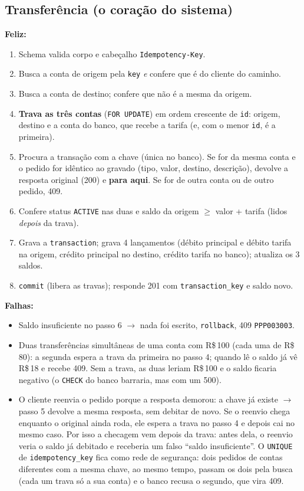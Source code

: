 \documentclass[11pt,a4paper]{article}
\newcommand{\rs}{R\$\,}
\newcommand{\tb}[1]{\texttt{#1}}           %
\begin{document}
\subsection{Transferência (o coração do sistema)}
\textbf{Feliz:}
\begin{enumerate}
  \item Schema valida corpo e cabeçalho \tb{Idempotency-Key}.
  \item Busca a conta de origem pela \tb{key} \emph{e} confere que é do cliente do caminho.
  \item Busca a conta de destino; confere que não é a mesma da origem.
  \item \textbf{Trava as três contas} (\tb{FOR UPDATE}) em ordem crescente de \tb{id}: origem,
        destino e a conta do banco, que recebe a tarifa (e, com o menor \tb{id}, é a primeira).
  \item Procura a transação com a chave (única no banco). Se for da mesma conta e o pedido for
        idêntico ao gravado (tipo, valor, destino, descrição), devolve a resposta original (200)
        e \textbf{para aqui}. Se for de outra conta ou de outro pedido, 409.
  \item Confere status \tb{ACTIVE} nas duas e saldo da origem $\ge$ valor + tarifa (lidos
        \emph{depois} da trava).
  \item Grava a \tb{transaction}; grava 4 lançamentos (débito principal e débito tarifa na
        origem, crédito principal no destino, crédito tarifa no banco); atualiza os 3 saldos.
  \item \tb{commit} (libera as travas); responde 201 com \tb{transaction_key} e saldo novo.
\end{enumerate}
\textbf{Falhas:}
\begin{itemize}
  \item Saldo insuficiente no passo 6 $\to$ nada foi escrito, \tb{rollback}, 409 \tb{PPP003003}.
  \item Duas transferências simultâneas de uma conta com \rs 100 (cada uma de \rs 80): a segunda
        espera a trava da primeira no passo 4; quando lê o saldo já vê \rs 18 e recebe 409. Sem a
        trava, as duas leriam \rs 100 e o saldo ficaria negativo (o \tb{CHECK} do banco
        barraria, mas com um 500).
  \item O cliente reenvia o pedido porque a resposta demorou: a chave já existe $\to$ passo 5
        devolve a mesma resposta, sem debitar de novo. Se o reenvio chega enquanto o original
        ainda roda, ele espera a trava no passo 4 e depois cai no mesmo caso. Por isso a checagem
        vem depois da trava: antes dela, o reenvio veria o saldo já debitado e receberia um falso
        ``saldo insuficiente''. O \tb{UNIQUE} de \tb{idempotency_key} fica como rede de
        segurança: dois pedidos de contas diferentes com a mesma chave, ao mesmo tempo, passam os
        dois pela busca (cada um trava só a sua conta) e o banco recusa o segundo, que vira 409.
\end{itemize}
\end{document}

